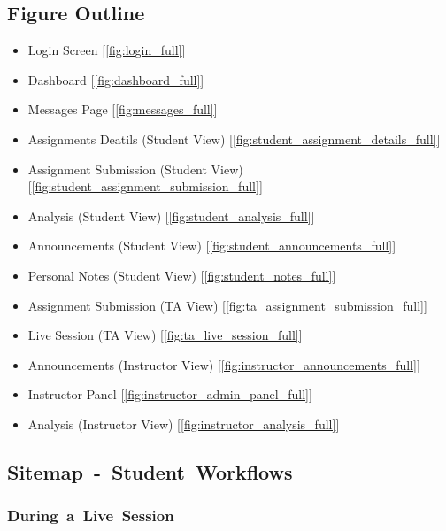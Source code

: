 \documentclass[a4paper, 12pt]{article}
\begin{document}
    \subsection{Figure Outline}
    \begin{itemize}
        \item Login Screen [\ref{fig:login_full}]
        \item Dashboard [\ref{fig:dashboard_full}]
        \item Messages Page [\ref{fig:messages_full}]
        \item Assignments Deatils (Student View) [\ref{fig:student_assignment_details_full}]
        \item Assignment Submission (Student View) [\ref{fig:student_assignment_submission_full}]
        \item Analysis (Student View) [\ref{fig:student_analysis_full}]
        \item Announcements (Student View) [\ref{fig:student_announcements_full}]
        \item Personal Notes (Student View) [\ref{fig:student_notes_full}]
        \item Assignment Submission (TA View) [\ref{fig:ta_assignment_submission_full}]
        \item Live Session (TA View) [\ref{fig:ta_live_session_full}]
        \item Announcements (Instructor View) [\ref{fig:instructor_announcements_full}]
        \item Instructor Panel [\ref{fig:instructor_admin_panel_full}]
        \item Analysis (Instructor View) [\ref{fig:instructor_analysis_full}]
    \end{itemize}

    \pagebreak

    \subsection{Sitemap~-~Student~Workflows}


    \subsubsection{During~a~Live~Session}
\end{document}
